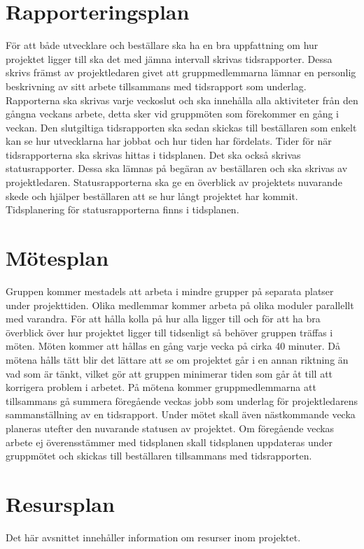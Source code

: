 \documentclass[projektplan/plan.tex]{subfiles}
\begin{document}
\section{Rapporteringsplan}
För att både utvecklare och beställare ska ha en bra uppfattning om hur
projektet ligger till ska det med jämna intervall skrivas tidsrapporter. Dessa
skrivs främst av projektledaren givet att gruppmedlemmarna lämnar en personlig
beskrivning av sitt arbete tillsammans med tidsrapport som underlag.
Rapporterna ska skrivas varje veckoslut och ska innehålla alla aktiviteter från
den gångna veckans arbete, detta sker vid gruppmöten som förekommer en gång i
veckan. Den slutgiltiga tidsrapporten ska sedan skickas till beställaren som
enkelt kan se hur utvecklarna har jobbat och hur tiden har fördelats. Tider för
när tidsrapporterna ska skrivas hittas i tidsplanen. Det ska också skrivas
statusrapporter. Dessa ska lämnas på begäran av beställaren och ska skrivas av
projektledaren. Statusrapporterna ska ge en överblick av projektets nuvarande
skede och hjälper beställaren att se hur långt projektet har kommit.
Tidsplanering för statusrapporterna finns i tidsplanen.

\section{Mötesplan}
Gruppen kommer mestadels att arbeta i mindre grupper på separata platser under
projekttiden. Olika medlemmar kommer arbeta på olika moduler parallellt med
varandra. För att hålla kolla på hur alla ligger till och för att ha bra
överblick över hur projektet ligger till tidsenligt så behöver gruppen träffas
i möten. Möten kommer att hållas en gång varje vecka på cirka 40 minuter. Då
mötena hålls tätt blir det lättare att se om projektet går i en annan riktning
än vad som är tänkt, vilket gör att gruppen minimerar tiden som går åt till att
korrigera problem i arbetet. På mötena kommer gruppmedlemmarna att tillsammans
gå summera föregående veckas jobb som underlag för projektledarens
sammanställning av en tidsrapport. Under mötet skall även nästkommande vecka
planeras utefter den nuvarande statusen av projektet. Om föregående veckas
arbete ej överensstämmer med tidsplanen skall tidsplanen uppdateras under
gruppmötet och skickas till beställaren tillsammans med tidsrapporten.

\section{Resursplan}
Det här avsnittet innehåller information om resurser inom projektet.
\end{document}

